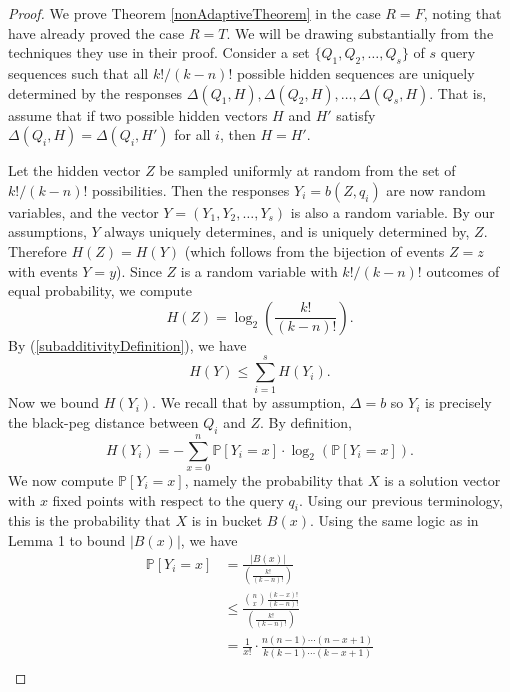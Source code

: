 \documentclass[12pt, a4paper]{article}
\begin{document}
\begin{proof}
	We prove Theorem \ref{nonAdaptiveTheorem} in the case $R = F$, noting that \cite{DS13} have already proved the case $R=T$. We will be drawing substantially from the techniques they use in their proof. Consider a set $\{Q_1, Q_2, \ldots, Q_s\}$ of $s$ query sequences such that all $k!/(k-n)!$ possible hidden sequences are uniquely determined by the responses $\Delta(Q_1, H), \Delta(Q_2, H), \ldots, \Delta(Q_s, H)$. That is, assume that if two possible hidden vectors $H$ and $H'$ satisfy $\Delta(Q_i, H) = \Delta(Q_i, H')$ for all $i$, then $H = H'$.

	Let the hidden vector $Z$ be sampled uniformly at random from the set of $k!/(k-n)!$ possibilities. Then the responses $Y_i = b(Z, q_i)$ are now random variables, and the vector $Y = (Y_1, Y_2, \ldots, Y_s)$ is also a random variable. By our assumptions, $Y$ always uniquely determines, and is uniquely determined by, $Z$. Therefore $H(Z) = H(Y)$ (which follows from the bijection of events $Z=z$ with events $Y=y$). Since $Z$ is a random variable with $k!/(k-n)!$ outcomes of equal probability, we compute
	\begin{equation}\label{equalEntropy}
		H(Z) = \log_2\left(\frac{k!}{(k-n)!}\right).
	\end{equation}
	By (\ref{subadditivityDefinition}), we have
	\begin{equation}\label{entropySum}
		H(Y)\le\sum_{i=1}^s H(Y_i).
	\end{equation}
	Now we bound $H(Y_i)$. We recall that by assumption, $\Delta = b$ so $Y_i$ is precisely the black-peg distance between $Q_i$ and $Z$. By definition,
	\begin{equation}\label{entropyDef}
		H(Y_i)=-\sum_{x=0}^n \mathbb{P}[Y_i=x]\cdot\log_2(\mathbb{P}[Y_{i}=x]).
	\end{equation}
	We now compute $\mathbb{P}[Y_i=x]$, namely the probability that $X$ is a solution vector with $x$ fixed points with respect to the query $q_i$. Using our previous terminology, this is the probability that $X$ is in bucket $B(x)$.
	Using the same logic as in Lemma 1 to bound $|B(x)|$, we have
	\begin{align*}
		\mathbb{P}[Y_i = x] &= \frac{|B(x)|}{\left(\frac{k!}{(k-n)!}\right)}\\
		&\leq \frac{\binom{n}{x}\frac{(k-x)!}{(k-n)!}}{\left(\frac{k!}{(k-n)!}\right)}\\
		&= \frac{1}{x!}\cdot\frac{n(n-1)\cdots(n-x+1)}{k(k-1)\cdots(k-x+1)}\\

\end{align*}
\end{proof}
\end{document}
